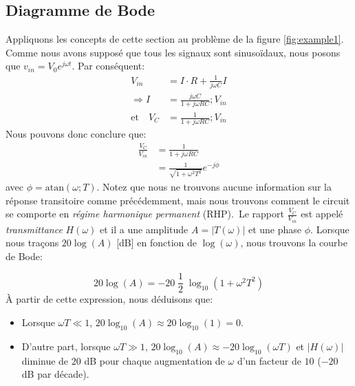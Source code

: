 \subsection{Diagramme de Bode}
Appliquons les concepts de cette section au problème de la figure \ref{fig:example1}. Comme nous avons supposé que tous les signaux sont sinusoïdaux, nous posons que $v_{in} = V_0 e^{j\omega t}$. Par conséquent:
\begin{align*}
	V_{in} &= I \cdot R + \frac{1}{j \omega C} I \\
	\Rightarrow I &= \frac{j \omega C}{1 + j \omega RC} ; V_{in}\\
	\text{et} \quad V_C &= \frac{1}{1 + j \omega RC} ; V_{in}
\end{align*}
Nous pouvons donc conclure que:
\begin{align*}
	\frac{V_C}{V_{in}} &= \frac{1}{1 + j \omega RC} \\
	&= \frac{1}{\sqrt{1 + \omega^2 T^2}} e^{-j \phi}
\end{align*}
avec $\phi = \text{atan}(\omega ; T)$. Notez que nous ne trouvons aucune information sur la réponse transitoire comme précédemment, mais nous trouvons comment le circuit se comporte en \emph{régime harmonique permanent} (RHP).\
Le rapport $\frac{V_C}{V_{in}}$ est appelé \emph{transmittance} $H(\omega)$ et il a une amplitude $A = |T(\omega)|$ et une phase $\phi$. Lorsque nous traçons $20 \log(A)$ [dB] en fonction de $\log(\omega)$, nous trouvons la courbe de Bode:

$$
20 \log(A) = -20 \; \frac{1}{2} \; \log_{10}(1 + \omega^2 T^2)
$$
À partir de cette expression, nous déduisons que:
\begin{itemize}
	\item Lorsque $\omega T \ll 1$, $20 \log_{10}(A) \approx 20 \log_{10}(1) = 0$.
	\item D'autre part, lorsque $\omega T \gg 1$, $20 \log_{10}(A) \approx -20 \log_{10}(\omega T)$ et $|H(\omega)|$ diminue de $20$ dB pour chaque augmentation de $\omega$ d'un facteur de $10$ ($-20$ dB par décade).
\end{itemize}

